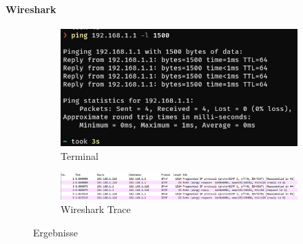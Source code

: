 \paragraph{Wireshark}
\begin{figure}[!htb]
    \centering
    \begin{subfigure}{.6\textwidth}
        \includegraphics[width=\textwidth]{./img/MF_ping.png}
        \caption{Terminal}
    \end{subfigure}
    \begin{subfigure}{\textwidth}
        \includegraphics[width=\textwidth,height=\textwidth,keepaspectratio]{./img/MF_ping_WS.png}
        \caption{Wireshark Trace}
    \end{subfigure}
    \caption{Ergebnisse}
\end{figure}
\FloatBarrier

